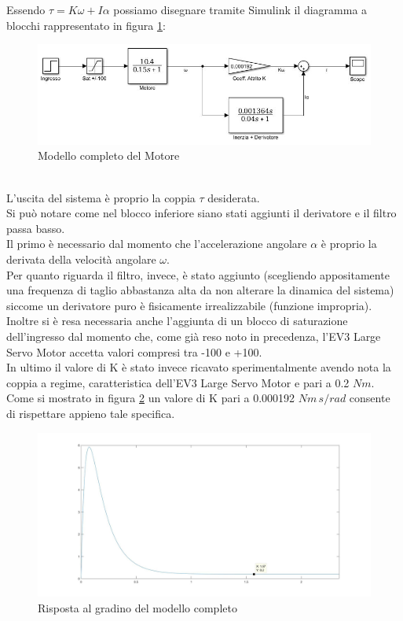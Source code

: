 Essendo $\tau=K\omega+I\alpha$ possiamo disegnare tramite Simulink il diagramma a blocchi rappresentato in figura \ref{modMotoreTorque}:
\begin{figure}[ht]
	\centering
	\includegraphics[width=\textwidth]{modMotoreTorque.jpg}
	\caption{Modello completo del Motore}
	\label{modMotoreTorque}
\end{figure}
\\L'uscita del sistema è proprio la coppia $\tau$ desiderata.\\
Si può notare come nel blocco inferiore siano stati aggiunti il derivatore e il filtro passa basso.\\
Il primo è necessario dal momento che l'accelerazione angolare $\alpha$ è proprio la derivata della velocità angolare $\omega$.\\
Per quanto riguarda il filtro, invece, è stato aggiunto (scegliendo appositamente una frequenza di taglio abbastanza alta da non alterare la dinamica del sistema) siccome un derivatore puro è fisicamente irrealizzabile (funzione impropria).\\
Inoltre si è resa necessaria anche l'aggiunta di un blocco di saturazione dell'ingresso dal momento che, come già reso noto in precedenza, l'EV3 Large Servo Motor accetta valori compresi tra -100 e +100.\\
In ultimo il valore di K è stato invece ricavato sperimentalmente avendo nota la coppia a regime, caratteristica dell'EV3 Large Servo Motor e pari a 0.2 $Nm$.\\
Come si mostrato in figura \ref{torque02} un valore di K pari a 0.000192 $Nm\,s/rad$ consente di rispettare appieno tale specifica.
\begin{figure}[ht]
	\centering
	\includegraphics[width=\textwidth]{torque02.jpg}
	\caption{Risposta al gradino del modello completo}
	\label{torque02}
\end{figure}